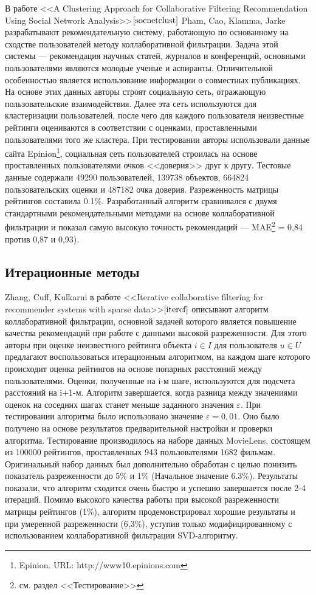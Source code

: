 \documentclass[a4paper, 12pt]{article} %
\begin{document}
\par В работе <<A Clustering Approach for Collaborative Filtering Recommendation Using Social Network Analysis>>$\cite{socnetclust}$ Pham, Cao, Klamma, Jarke разрабатывают рекомендательную систему, работающую по основанному на сходстве пользователей методу коллаборативной фильтрации. Задача этой системы --- рекомендация научных статей, журналов и конференций, основными пользователями являются молодые ученые и аспиранты. Отличительной особенностью является использование информации о совместных публикациях. На основе этих данных авторы строят социальную сеть, отражающую пользовательские взаимодействия. Далее эта сеть используются для кластеризации пользователей, после чего для каждого пользователя неизвестные рейтинги оцениваются в соответствии с оценками, проставленными пользователями того же кластера. При тестировании авторы использовали данные сайта Epinion\footnote{Epinion. URL: http://www10.epinions.com}, социальная сеть пользователей строилась на основе проставленных пользователями очков <<доверия>> друг к другу. Тестовые данные содержали 49290 пользователей, 139738 объектов, 664824 пользовательских оценки и 487182 очка доверия. Разреженность матрицы рейтингов составила 0.1\%. Разработанный алгоритм сравнивался с двумя стандартными рекомендательными методами на основе коллаборативной фильтрации и показал самую высокую точность рекомендаций --- MAE\footnote{см. раздел <<Тестирование>>} = 0,84 против 0,87 и 0,93).  

\subsection{Итерационные методы}
\par
Zhang, Cuff, Kulkarni в работе <<Iterative collaborative filtering for recommender systems with sparse data>>$\cite{itercf}$ описывают алгоритм коллаборативной фильтрации, основной задачей которого является повышение качества рекомендаций при работе с данными высокой разреженности. Для этого авторы при оценке неизвестного рейтинга объекта $i \in I$ для пользователя $u \in U$ предлагают воспользоваться итерационным алгоритмом, на каждом шаге которого происходит оценка рейтингов на основе попарных расстояний между пользователями. Оценки, полученные на i-м шаге, используются для подсчета расстояний на i+1-м. Алгоритм завершается, когда разница между значениями оценок на соседних шагах станет меньше заданного значения $\varepsilon$. При тестировании алгоритма было использовано значение $\varepsilon=0,01$. Оно было получено на основе результатов предварительной настройки и проверки алгоритма. Тестирование производилось на наборе данных MovieLens, состоящем из 100000 рейтингов, проставленных 943 пользователями 1682 фильмам. Оригинальный набор данных был дополнительно обработан с целью понизить показатель разреженности до 5\% и 1\% (Начальное значение 6.3\%). Результаты показали, что алгоритм сходится очень быстро и успешно завершается после 2-4 итераций. Помимо высокого качества работы при высокой разреженности матрицы рейтингов (1\%), алгоритм продемонстрировал хорошие результаты и при умеренной разреженности (6,3\%), уступив только модифицированному с использованием коллаборативной фильтрации SVD-алгоритму\cite{cfbasedsvd}.
\end{document}
